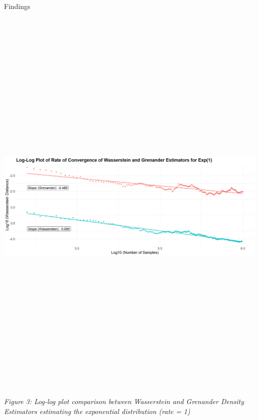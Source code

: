 \documentclass[final]{beamer}
\newlength{\colwidth}
\begin{document}
\begin{frame}[t]
\begin{columns}[t]
\begin{column}{\colwidth}
\begin{block}{Findings}
\vspace{0.1em}



\vspace{2cm}

\centering
\includegraphics[width=1\textwidth, height=20cm]{UofT Poster Template Tex/figures/Plot_Data2.png}
\vspace{0.1em}
\textit{Figure 3: Log-log plot comparison between Wasserstein and Grenander Density Estimators estimating the exponential distribution (rate = 1)}

\vspace{0.1em}



\end{block}




\end{column}
\end{columns}
\end{frame}
\end{document}
